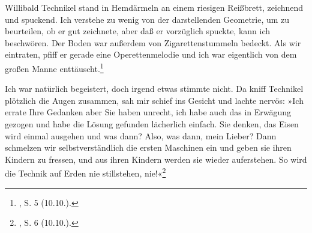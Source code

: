 \documentclass[%
	fontsize=10pt,%
	twoside,%
	headings=optiontoheadandtoc,%
	showtrims]{scrbook}
\renewenvironment{quote}{%
  \addmargin[\genericindent]{0pt}%
  \KOMAoptions{parskip=true}%
  \ifdim\parskip>0pt\else\addvspace{\intextsep}\fi
}{%
  \par
  \endaddmargin\vspace{\intextsep}
}
\begin{document}
\begin{quote}
\par Willibald Technikel stand in Hemdärmeln an einem riesigen Reißbrett, zeichnend und spuckend. Ich verstehe zu wenig von der darstellenden Geometrie, um zu beurteilen, ob er gut zeichnete, aber daß er vorzüglich spuckte, kann ich beschwören. Der Boden war außerdem von Zigarettenstummeln bedeckt. Als wir eintraten, pfiff er gerade eine Operettenmelodie und ich war eigentlich von dem großen Manne enttäuscht.\footnote{\cite[][]{fischer1925a}, S. 5 (10.10.).} \par Ich war natürlich begeistert, doch irgend etwas stimmte nicht. Da kniff Technikel plötzlich die Augen zusammen, sah mir schief ins Gesicht und lachte nervös: »Ich errate Ihre Gedanken \textendash{} aber Sie haben unrecht, ich habe auch das in Erwägung gezogen und habe die Lösung gefunden \textendash{} lächerlich einfach. Sie denken, das Eisen wird einmal ausgehen und was dann? Also, was dann, mein Lieber? Dann schmelzen wir selbstverständlich die ersten Maschinen ein und geben sie ihren Kindern zu fressen, und aus ihren Kindern werden sie wieder auferstehen. So wird die Technik auf Erden nie stillstehen, nie!«\footnote{\cite[][]{fischer1925a}, S. 6 (10.10.).} 
\end{quote}
\end{document}
